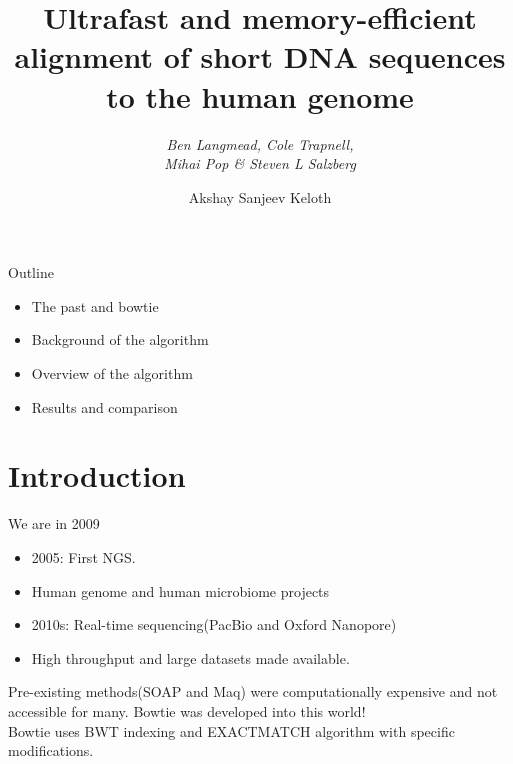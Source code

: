 \documentclass[mathserif]{beamer}
\title{\textbf{Ultrafast and memory-efficient alignment of short DNA sequences
to the human genome}}
\subtitle{\textit{Ben Langmead, Cole Trapnell, \\Mihai Pop \& Steven L Salzberg}}
\author{Akshay Sanjeev Keloth}
\begin{document}
\begin{frame}
    \maketitle
\end{frame}

\begin{frame}{Outline }
    \begin{itemize}
        \item The past and bowtie
        \item Background of the algorithm
        \item Overview of the algorithm
        \item Results and comparison
    \end{itemize}
\end{frame}

\section{Introduction}
\begin{frame}{We are in 2009}
    \begin{itemize}
        \item 2005: First NGS.
        \item Human genome and human microbiome projects
        \item 2010s: Real-time sequencing(PacBio and Oxford Nanopore)
        \item High throughput and large datasets made available.
    \end{itemize}
    Pre-existing methods(SOAP and Maq) were computationally expensive and not accessible 
    for many. Bowtie was developed into this world!\\

    \vspace{5mm}
    Bowtie uses BWT indexing and EXACTMATCH algorithm with specific modifications. 
\end{frame}
\end{document}

